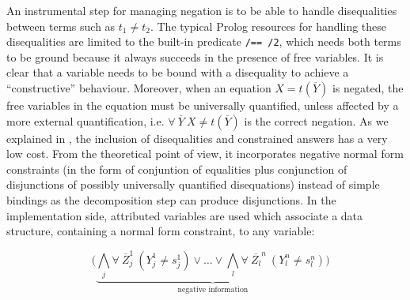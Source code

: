 \documentclass{tlp}
\begin{document}
An instrumental step for managing negation is to be able to handle
disequalities between terms such as $t_1 \neq t_2$.  The typical
Prolog resources for handling these disequalities are limited to the
built-in predicate {\tt /== /2}, which needs both terms to be ground
because it always succeeds in the presence of free variables.  It is
clear that a variable needs to be bound with a disequality to achieve
a ``constructive'' behaviour.  Moreover, when an equation $X =
t(\overline{Y})$ is negated, the free variables in the equation must
be universally quantified, unless affected by a more external
quantification, i.e. $\forall~ \overline{Y}~X \neq t(\overline{Y})$ is
the correct negation.  As we explained in \cite{SusanaPADL2000}, the
inclusion of disequalities and constrained answers has a very low
cost. From the theoretical point of view, it incorporates negative normal form 
constraints (in the form of conjuntion of equalities plus conjunction of 
disjunctions of possibly universally quantified
disequations) instead of simple bindings as the decomposition step can produce 
disjunctions. In the implementation side, attributed variables are used 
which associate a data structure, containing a
normal form constraint, to any variable: 

\[~~~~( \underbrace{\bigwedge_j \forall~ \overline{Z}_j^1~(Y_j^1 \neq s_j^1) 
\vee \ldots \vee \bigwedge_l \forall~ \overline{Z_l}^n~(Y_l^n \neq s_l^n) ) }_{\mbox{negative information}} \]




\end{document}
